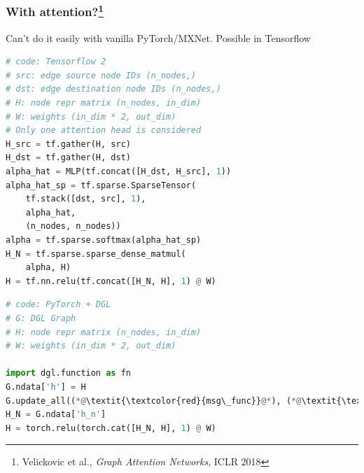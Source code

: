 \documentclass[10pt,aspectratio=169]{beamer}
\begin{document}
	\begin{frame}[fragile]
		\frametitle{With attention?\footnote{Velickovic et al., \emph{Graph Attention Networks}, ICLR 2018}}
		Can't do it easily with vanilla PyTorch/MXNet.  Possible in Tensorflow
		\begin{minipage}{0.5\textwidth}
\begin{lstlisting}[language=Python]
# code: Tensorflow 2
# src: edge source node IDs (n_nodes,)
# dst: edge destination node IDs (n_nodes,)
# H: node repr matrix (n_nodes, in_dim)
# W: weights (in_dim * 2, out_dim)
# Only one attention head is considered
H_src = tf.gather(H, src)
H_dst = tf.gather(H, dst)
alpha_hat = MLP(tf.concat([H_dst, H_src], 1))
alpha_hat_sp = tf.sparse.SparseTensor(
    tf.stack([dst, src], 1),
    alpha_hat,
    (n_nodes, n_nodes))
alpha = tf.sparse.softmax(alpha_hat_sp)
H_N = tf.sparse.sparse_dense_matmul(
    alpha, H)
H = tf.nn.relu(tf.concat([H_N, H], 1) @ W)
\end{lstlisting}
		\end{minipage}%
		\begin{minipage}{0.5\textwidth}
\begin{lstlisting}[language=Python]
# code: PyTorch + DGL
# G: DGL Graph
# H: node repr matrix (n_nodes, in_dim)
# W: weights (in_dim * 2, out_dim)

import dgl.function as fn
G.ndata['h'] = H
G.update_all((*@\textit{\textcolor{red}{msg\_func}}@*), (*@\textit{\textcolor{red}{reduce\_func}}@*))
H_N = G.ndata['h_n']
H = torch.relu(torch.cat([H_N, H], 1) @ W)
\end{lstlisting}
		\end{minipage}
	\end{frame}
\end{document}
